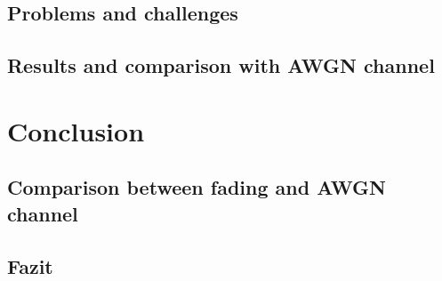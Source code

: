 \documentclass[12pt,oneside, reqno]{report}
\begin{document}
\section{Problems and challenges}

\section{Results and comparison with AWGN channel}


\chapter{Conclusion}

\section{Comparison between fading and AWGN channel}

\section{Fazit}




 
















%
\end{document}
